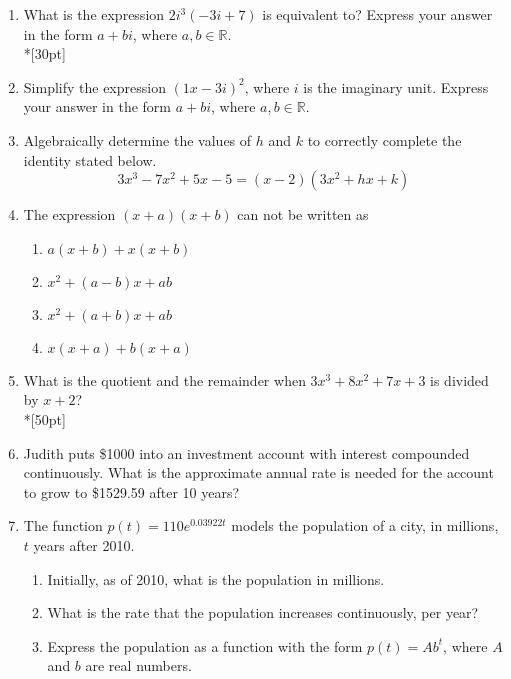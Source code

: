 \documentclass[12pt, oneside]{article}
\begin{document}
\begin{enumerate}
\item What is the expression $2i^3(-3i+7)$ is equivalent to? Express your answer in the form $a+bi$, where $a, b \in \mathbb{R}$.\\*[30pt]  %

\item Simplify the expression $(1x - 3i)^2$, where $i$ is the imaginary unit. Express your answer in the form $a+bi$, where $a, b \in \mathbb{R}$.\\[30pt] %

\item Algebraically determine the values of $h$ and $k$ to correctly complete the identity stated below.
\[3x^3-7x^2+5x-5=(x-2)(3x^2+hx+k)\] %

\newpage
\item The expression $(x + a)(x + b)$ can not be written as
\begin{enumerate}
    \item $a(x + b)+ x(x + b)$
    \item $x^2 + (a - b)x + ab$ 
    \item  $x^2 + (a + b)x + ab$  
    \item $x(x + a)+ b(x + a)$
\end{enumerate}

\item What is the quotient and the remainder when $3x^3+8x^2+7x+3$ is divided by $x+2$?\\*[50pt]

\newpage
\item Judith puts \$1000 into an investment account with interest compounded continuously. What is the approximate annual rate is needed for the account to grow to \$1529.59 after 10 years?

\item The function $p(t)=110e^{0.03922t}$ models the population of a city, in millions, $t$ years after 2010.
\begin{enumerate}
    \item Initially, as of 2010, what is the population in millions.\\[40pt]
    \item What is the rate that the population increases continuously, per year?\\[40pt]
    \item Express the population as a function with the form $p(t)=Ab^{t}$, where $A$ and $b$ are real numbers.\\[40pt]
\end{enumerate}


\end{enumerate}
\end{document}

